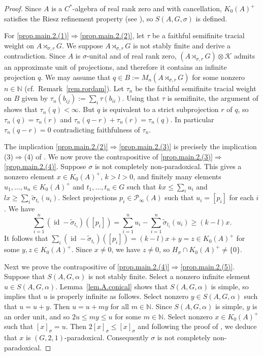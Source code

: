 \documentclass[a4paper, 12pt]{amsart}
\numberwithin{equation}{section}
\theoremstyle{remark}
\theoremstyle{definition}
\begin{document}
\begin{proof}
Since $A$ is a $C^*$-algebra of  real rank  zero and with cancellation,  $K_0(A)^+$ satisfies
the Riesz  refinement property (see \cite{MR1301484, MR1150618}), so $S(A,G,\sigma)$ is
defined.

For \eqref{prop.main.2.(1)}$\Rightarrow$\eqref{prop.main.2.(2)}, let $\tau$ be a faithful semifinite tracial weight on
$A\rtimes_{\sigma,r} G$. We suppose $A\rtimes_{\sigma,r} G$ is not
stably finite and derive a contradiction. Since $A$ is $\sigma$-unital and of real rank zero, $(A\rtimes_{\sigma,r}
G)\otimes {\mathcal{K}}$ admits an approximate unit of projections, and therefore it contains an
infinite projection $q$. We may assume that $q\in B:=M_n(A\rtimes_{\sigma,r} G)$ for some
nonzero $n\in {\mathbb{N}}$ (cf.~Remark~\ref{rem.rordam}). Let $\tau_n$ be the faithful semifinite tracial
weight on $B$ given by $\tau_n(b_{ij}):=\sum_i\tau(b_{ii})$. Using that $\tau$ is
semifinite, the argument of \cite[Lemma~3.2]{MR2204676} shows that $\tau_n(q)<\infty$.
But $q$ is equivalent to a strict subprojection $r$ of $q$, so $\tau_n(q)=\tau_n(r)$ and
$\tau_n(q-r)+\tau_n(r)=\tau_n(q)$. In particular $\tau_n(q-r)=0$ contradicting
faithfulness of $\tau_n$.

The implication \eqref{prop.main.2.(2)}$\Rightarrow$\eqref{prop.main.2.(3)} is precisely the implication (3)$\Rightarrow$(4) of \cite[Proposition~3.1]{MR3507995}. We now prove the contrapositive of
\eqref{prop.main.2.(3)}$\Rightarrow$\eqref{prop.main.2.(4)}. Suppose $\sigma$ is not completely non-paradoxical. This gives a
nonzero element $x \in K_0(A)^+$, $k>l>0$, and finitely many elements $u_1,\dots,u_n\in
K_0(A)^+$ and $t_1,\dots,t_n\in G$ such that $kx\leq \sum_iu_i$  and $lx\geq
\sum_i\tilde\sigma_{t_i}(u_i)$. Select projections  $p_i\in
{\mathcal{P}}_\infty(A)$ such that $u_i=[p_i]$ for each $i$. We have
$$\sum_{i=1}^n ({\operatorname{id}} - \tilde\sigma_{t_i})([p_i])=\sum_{i=1}^nu_i -\sum_{i=1}^n\tilde\sigma_{t_i}(u_i)\geq (k-l)x.$$ It follows that
$\sum_i ({\operatorname{id}} - \tilde\sigma_{t_i})([p_i])=(k-l)x+y=z\in K_0(A)^+$ for some $y,z\in
K_0(A)^+$. Since $x\neq 0$, we have $z\neq 0$, so $H_\sigma \cap K_0(A)^+ \neq \{0\}$.

Next we prove the contrapositive of \eqref{prop.main.2.(4)}$\Rightarrow$\eqref{prop.main.2.(5)}. Suppose that $S(A,G,\alpha)$ is
not stably finite. Select a nonzero infinite element $u\in S(A,G,\alpha)$.
Lemma~\ref{lem.A.conical} shows that $S(A,G,\alpha)$ is simple, so \cite[p.~4510]{MR2806681} implies that $u$ is properly infinite as follows. Select nonzero $y\in
S(A,G,\alpha)$ such that $u = u + y$. Then $u = u + my$ for all $m \in  {\mathbb{N}}$. Since $S(A,G,\alpha)$ is simple, $y$ is
an order unit, and so $2u \leq my \leq u$ for some $m\in{\mathbb{N}}$. Select nonzero $x\in
K_0(A)^+$ such that $[x]_\sigma=u$. Then $2[x]_\sigma\leq [x]_\sigma$ and following the
proof of \cite[Lemma~4.10]{Rai}, we deduce that $x$ is $(G,2,1)$-paradoxical.
Consequently $\sigma$ is not completely non-paradoxical.


\end{proof}
\end{document}
